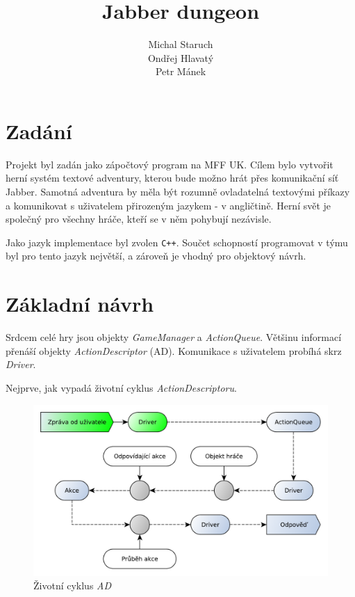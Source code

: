 \documentclass[11pt, a4paper]{article}
\title{\textbf{Jabber dungeon}}
\author{Michal Staruch\\
		Ondřej Hlavatý\\
		Petr Mánek}
\date{}
\def\class#1{\emph{#1}}
\begin{document}
\maketitle

\section{Zadání}

Projekt byl zadán jako zápočtový program na MFF UK. Cílem bylo vytvořit herní systém textové adventury, kterou bude možno hrát přes komunikační síť Jabber. Samotná adventura by měla být rozumně ovladatelná textovými příkazy a komunikovat s uživatelem přirozeným jazykem - v angličtině. Herní svět je společný pro všechny hráče, kteří se v něm pohybují nezávisle.

Jako jazyk implementace byl zvolen \texttt{C++}. Součet schopností programovat v týmu byl pro tento jazyk největší, a zároveň je vhodný pro objektový návrh.

\section{Základní návrh}

Srdcem celé hry jsou objekty \class{GameManager} a \class{ActionQueue}. Většinu informací přenáší objekty \class{ActionDescriptor} (AD). Komunikace s uživatelem probíhá skrz \class{Driver}.

Nejprve, jak vypadá životní cyklus \class{ActionDescriptoru}.
\begin{figure}[htp]
\centering
\includegraphics[scale=0.6]{AD-lifecycle.pdf}
\caption{Životní cyklus \class{AD}}
\label{ad-lifecycle}
\end{figure}
\end{document}
